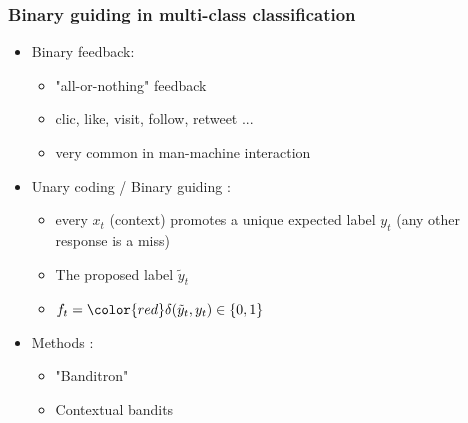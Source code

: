 \documentclass{beamer}
\begin{document}
\begin{frame}
	\frametitle{Binary guiding in multi-class classification}
	
	\begin{itemize}
		\item Binary feedback:
		\begin{itemize}
			\item "all-or-nothing" feedback
			\item clic, like, visit, follow, retweet ...
			\item very common in man-machine interaction
		\end{itemize}
		\item Unary coding / Binary guiding : 
		\begin{itemize}
			\item every $x_t$ (context) promotes a unique expected label $y_t$
			(any other response is a miss)
			\item The proposed label $\tilde{y}_t$
			\item $f_t = {\color{red}\delta(\tilde{y}_t ,y_t)} \in \{0,1\}$
		\end{itemize}
		\item Methods :
		\begin{itemize}
			\item "Banditron" \cite{kakade2008efficient}
			\item Contextual bandits
		\end{itemize}
	\end{itemize}
\end{frame}





%			
\end{document}
